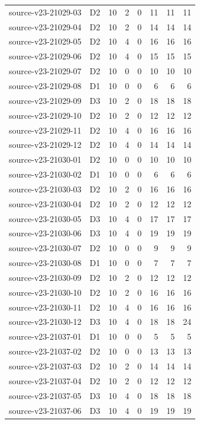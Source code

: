 \begin{longtable}{p{}lrrrrrr}
source-v23-21029-03 & D2 & 10 & 2 & 0 & 11 & 11 & 11\\
source-v23-21029-04 & D2 & 10 & 2 & 0 & 14 & 14 & 14\\
source-v23-21029-05 & D2 & 10 & 4 & 0 & 16 & 16 & 16\\
source-v23-21029-06 & D2 & 10 & 4 & 0 & 15 & 15 & 15\\
source-v23-21029-07 & D2 & 10 & 0 & 0 & 10 & 10 & 10\\
source-v23-21029-08 & D1 & 10 & 0 & 0 & 6 & 6 & 6\\
source-v23-21029-09 & D3 & 10 & 2 & 0 & 18 & 18 & 18\\
source-v23-21029-10 & D2 & 10 & 2 & 0 & 12 & 12 & 12\\
source-v23-21029-11 & D2 & 10 & 4 & 0 & 16 & 16 & 16\\
source-v23-21029-12 & D2 & 10 & 4 & 0 & 14 & 14 & 14\\
source-v23-21030-01 & D2 & 10 & 0 & 0 & 10 & 10 & 10\\
source-v23-21030-02 & D1 & 10 & 0 & 0 & 6 & 6 & 6\\
source-v23-21030-03 & D2 & 10 & 2 & 0 & 16 & 16 & 16\\
source-v23-21030-04 & D2 & 10 & 2 & 0 & 12 & 12 & 12\\
source-v23-21030-05 & D3 & 10 & 4 & 0 & 17 & 17 & 17\\
source-v23-21030-06 & D3 & 10 & 4 & 0 & 19 & 19 & 19\\
source-v23-21030-07 & D2 & 10 & 0 & 0 & 9 & 9 & 9\\
source-v23-21030-08 & D1 & 10 & 0 & 0 & 7 & 7 & 7\\
source-v23-21030-09 & D2 & 10 & 2 & 0 & 12 & 12 & 12\\
source-v23-21030-10 & D2 & 10 & 2 & 0 & 16 & 16 & 16\\
source-v23-21030-11 & D2 & 10 & 4 & 0 & 16 & 16 & 16\\
source-v23-21030-12 & D3 & 10 & 4 & 0 & 18 & 18 & 24\\
source-v23-21037-01 & D1 & 10 & 0 & 0 & 5 & 5 & 5\\
source-v23-21037-02 & D2 & 10 & 0 & 0 & 13 & 13 & 13\\
source-v23-21037-03 & D2 & 10 & 2 & 0 & 14 & 14 & 14\\
source-v23-21037-04 & D2 & 10 & 2 & 0 & 12 & 12 & 12\\
source-v23-21037-05 & D3 & 10 & 4 & 0 & 18 & 18 & 18\\
source-v23-21037-06 & D3 & 10 & 4 & 0 & 19 & 19 & 19\\

\end{longtable}
